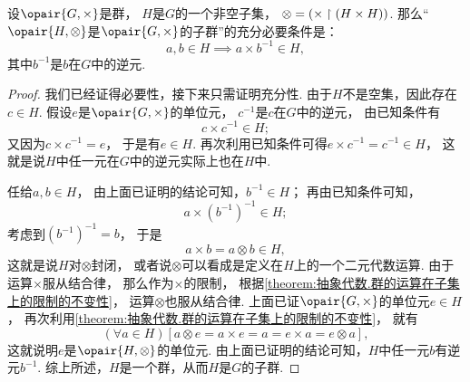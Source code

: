 \begin{theorem}
设\(\opair{G,\times}\)是群，
\(H\)是\(G\)的一个非空子集，
\(\otimes = (\times \upharpoonright(H \times H))\).
那么“\(\opair{H,\otimes}\)是\(\opair{G,\times}\)的子群”的充分必要条件是：\begin{equation*}
	a,b \in H \implies a \times b^{-1} \in H,
\end{equation*}
其中\(b^{-1}\)是\(b\)在\(G\)中的逆元.
\begin{proof}
我们已经证得必要性，接下来只需证明充分性.
由于\(H\)不是空集，因此存在\(c \in H\).
假设\(e\)是\(\opair{G,\times}\)的单位元，
\(c^{-1}\)是\(c\)在\(G\)中的逆元，
由已知条件有\begin{equation*}
	c \times c^{-1} \in H;
\end{equation*}
又因为\(c \times c^{-1} = e\)，
于是有\(e \in H\).
再次利用已知条件可得\(e \times c^{-1} = c^{-1} \in H\)，
这就是说\(H\)中任一元在\(G\)中的逆元实际上也在\(H\)中.

任给\(a,b \in H\)，
由上面已证明的结论可知，\(b^{-1} \in H\)；
再由已知条件可知，\begin{equation*}
	a \times (b^{-1})^{-1} \in H;
\end{equation*}
考虑到\((b^{-1})^{-1} = b\)，
于是\begin{equation*}
	a \times b = a \otimes b \in H,
\end{equation*}
这就是说\(H\)对\(\otimes\)封闭，
或者说\(\otimes\)可以看成是定义在\(H\)上的一个二元代数运算.
由于运算\(\times\)服从结合律，
那么作为\(\times\)的限制，
根据\cref{theorem:抽象代数.群的运算在子集上的限制的不变性}，
运算\(\otimes\)也服从结合律.
上面已证\(\opair{G,\times}\)的单位元\(e \in H\)，
再次利用\cref{theorem:抽象代数.群的运算在子集上的限制的不变性}，
就有\begin{equation*}
	(\forall a \in H)[
		a \otimes e = a \times e = a = e \times a = e \otimes a
	],
\end{equation*}
这就说明\(e\)是\(\opair{H,\otimes}\)的单位元.
由上面已证明的结论可知，\(H\)中任一元\(b\)有逆元\(b^{-1}\).
综上所述，\(H\)是一个群，从而\(H\)是\(G\)的子群.
\end{proof}
\end{theorem}

